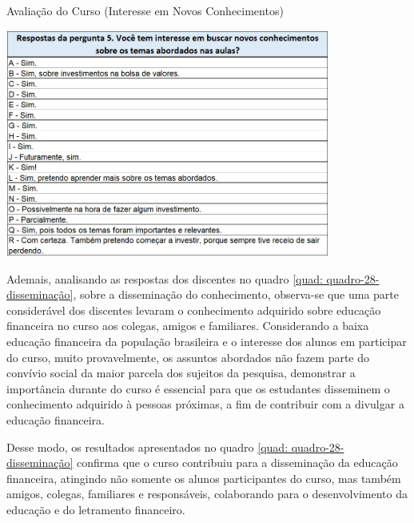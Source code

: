 \graphicspath{{quadros/}} 
\begin{quadro}[!ht]
\centering
\begin{minipage}{0.80\textwidth}
\caption{Avaliação do Curso (Interesse em Novos Conhecimentos)}
\centering
\includegraphics[width=0.80\textwidth]{quadro-27-novos-estudos}
\label{quad: quadro-27-novos-estudos}
\end{minipage}
\end{quadro}

Ademais, analisando as respostas dos discentes no quadro \ref{quad: quadro-28-disseminação}, sobre a disseminação do conhecimento, observa-se que uma parte considerável dos discentes levaram o conhecimento adquirido sobre educação financeira no curso aos colegas, amigos e familiares. Considerando a baixa educação financeira da população brasileira e o interesse dos alunos em participar do curso, muito provavelmente, os assuntos abordados não fazem parte do convívio social da maior parcela dos sujeitos da pesquisa, demonstrar a importância durante do curso é essencial para que os estudantes disseminem o conhecimento adquirido à pessoas próximas, a fim de contribuir com a divulgar a educação financeira.

Desse modo, os resultados apresentados no quadro \ref{quad: quadro-28-disseminação} confirma que o curso contribuiu para a disseminação da educação financeira, atingindo não somente os alunos participantes do curso, mas também amigos, colegas, familiares e responsáveis, colaborando para o desenvolvimento da educação e do letramento financeiro.

